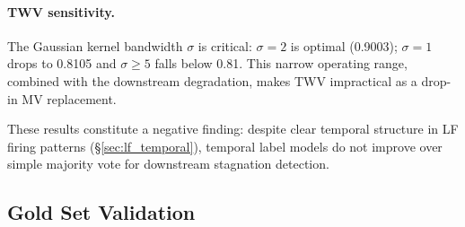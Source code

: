 \paragraph{TWV sensitivity.}
The Gaussian kernel bandwidth $\sigma$ is critical: $\sigma{=}2$ is optimal (0.9003); $\sigma{=}1$ drops to 0.8105 and $\sigma{\geq}5$ falls below 0.81.
This narrow operating range, combined with the downstream degradation, makes TWV impractical as a drop-in MV replacement.

These results constitute a negative finding: despite clear temporal structure in LF firing patterns (\S\ref{sec:lf_temporal}), temporal label models do not improve over simple majority vote for downstream stagnation detection.

\subsection{Gold Set Validation}
\label{sec:gold_set}
